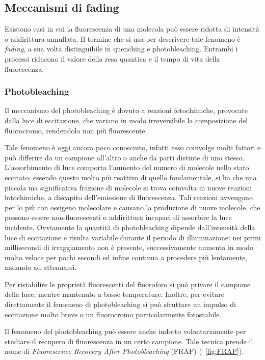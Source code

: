 \subsection{Meccanismi di fading}

Esistono casi in cui la fluorescenza di una molecola può essere ridotta di intensità o addirittura annullata. 
Il termine che si usa per descrivere tale fenomeno è \textit{fading}, a sua volta distinguibile in quenching e photobleaching.
Entrambi i processi riducono il valore della resa quantica e il tempo di vita della fluorescenza.

\subsubsection{Photobleaching}
Il meccanismo del photobleaching è dovuto a reazioni fotochimiche, provocate dalla luce di eccitazione, che variano in modo irreversibile la composizione del fluorocromo, rendendolo non più fluorescente. 

Tale fenomeno è oggi ancora poco conosciuto, infatti esso coinvolge molti fattori e può differire da un campione all'altro o anche da parti distinte di uno stesso.
L'assorbimento di luce comporta l'aumento del numero di molecole nello stato eccitato; essendo questo molto più reattivo di quello fondamentale, si ha che una piccola ma significativa frazione di molecole si trova coinvolta in nuove reazioni fotochimiche, a discapito dell'emissione di fluorescenza. 
Tali reazioni avvengono per lo più con ossigeno molecolare e causano la produzione di nuove molecole, che possono essere non-fluorescenti o addirittura incapaci di assorbire la luce incidente.
Ovviamente la quantità di photobleaching dipende dall'intensità della luce di eccitazione e risulta variabile durante il periodo di illuminazione: nei primi millisecondi di irraggiamento non è presente, successivamente aumenta in modo molto veloce per pochi secondi ed infine continua a procedere  più lentamente, andando ad attenuarsi.

Per ristabilire le proprietà fluorescenti del fluoroforo si può privare il campione della luce, mentre mantenuto a basse temperature. 
Inoltre, per evitare direttamente il fenomeno di photobleaching si può sfruttare un impulso di eccitazione molto breve o un fluorocromo particolarmente fotostabile.

Il fenomeno del photobleaching può essere anche indotto volontariamente per studiare il recupero di fluorescenza in un certo campione. 
Tale tecnica prende il nome di \textit{Fluorescence Recovery After Photobleaching} (FRAP) (\figurename~\ref{fig:FRAP}).

